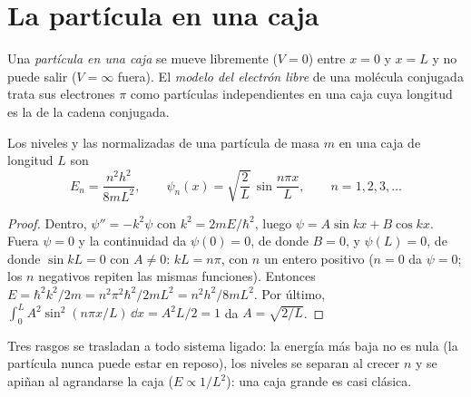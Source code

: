 \section{La partícula en una caja}

\begin{definition}\label{def:b3:quantum-model-systems:box}
Una \emph{partícula en una caja} se mueve libremente ($V = 0$)
entre $x = 0$ y $x = L$ y no puede salir ($V = \infty$ fuera). El
\emph{modelo del electrón libre} de una molécula
conjugada trata sus electrones $\pi$ como partículas independientes en una caja cuya
longitud es la de la cadena conjugada.
\end{definition}

\begin{theorem}\label{thm:b3:quantum-model-systems:box}
Los niveles y las  normalizadas de una partícula de masa $m$ en una caja
de longitud $L$ son
\[
E_n = \frac{n^2h^2}{8mL^2}, \qquad \psi_n(x) = \sqrt{\frac2L}\,\sin\frac{n\pi
x}{L}, \qquad n = 1, 2, 3, \dots
\]
\end{theorem}

\begin{proof}
Dentro, $\psi'' = -k^2\psi$ con $k^2 = 2mE/\hbar^2$, luego $\psi = A\sin kx +
B\cos kx$. Fuera $\psi = 0$ y la continuidad da $\psi(0) = 0$, de donde $B =
0$, y $\psi(L) = 0$, de donde $\sin kL = 0$ con $A \ne 0$: $kL = n\pi$, con $n$ un
entero positivo ($n = 0$ da $\psi = 0$; los $n$ negativos repiten las mismas
funciones). Entonces $E = \hbar^2k^2/2m = n^2\pi^2\hbar^2/2mL^2 = n^2h^2/8mL^2$.
Por último, $\int_0^L A^2\sin^2(n\pi x/L)\,\dd x = A^2L/2 = 1$ da $A =
\sqrt{2/L}$.
\end{proof}

Tres rasgos se trasladan a todo sistema ligado: la energía más baja no es
nula (la partícula nunca puede estar en reposo), los niveles se separan al crecer
$n$ y se apiñan al agrandarse la caja ($E \propto 1/L^2$): una
caja grande es casi clásica.

